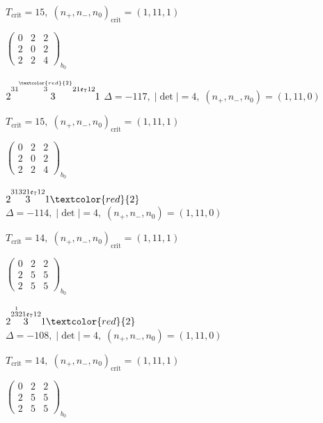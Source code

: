 \documentclass[10pt]{article}
\begin{document}
\hspace{1em}$T_{\text{crit}}=15,\; (n_+,n_-,n_0)_{\text{crit}}=(1,11,1)$

\hspace{2em}$\left(\begin{smallmatrix}0 & 2 & 2 \\ 2 & 0 & 2 \\ 2 & 2 & 4\end{smallmatrix}\right)_{\!b_0}$

\smallskip

$2\overset{31\overset{\textcolor{red}{2}}{3}21\mathfrak{e}_712}{3}1$ \quad $\Delta=-117,\; |\det|=4,\; (n_+,n_-,n_0)=(1,11,0)$

\hspace{1em}$T_{\text{crit}}=15,\; (n_+,n_-,n_0)_{\text{crit}}=(1,11,1)$

\hspace{2em}$\left(\begin{smallmatrix}0 & 2 & 2 \\ 2 & 0 & 2 \\ 2 & 2 & 4\end{smallmatrix}\right)_{\!b_0}$

$2\overset{31321\mathfrak{e}_712}{3}1\textcolor{red}{2}$ \quad $\Delta=-114,\; |\det|=4,\; (n_+,n_-,n_0)=(1,11,0)$

\hspace{1em}$T_{\text{crit}}=14,\; (n_+,n_-,n_0)_{\text{crit}}=(1,11,1)$

\hspace{2em}$\left(\begin{smallmatrix}0 & 2 & 2 \\ 2 & 5 & 5 \\ 2 & 5 & 5\end{smallmatrix}\right)_{\!b_0}$

\smallskip

$2\overset{2\overset{1}{3}21\mathfrak{e}_712}{3}1\textcolor{red}{2}$ \quad $\Delta=-108,\; |\det|=4,\; (n_+,n_-,n_0)=(1,11,0)$

\hspace{1em}$T_{\text{crit}}=14,\; (n_+,n_-,n_0)_{\text{crit}}=(1,11,1)$

\hspace{2em}$\left(\begin{smallmatrix}0 & 2 & 2 \\ 2 & 5 & 5 \\ 2 & 5 & 5\end{smallmatrix}\right)_{\!b_0}$
\end{document}
